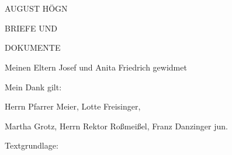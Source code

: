 





























AUGUST HÖGN



BRIEFE UND

DOKUMENTE

Meinen Eltern Josef und Anita Friedrich gewidmet



































































Mein Dank gilt:

Herrn Pfarrer Meier, Lotte Freisinger,

Martha Grotz, Herrn Rektor Roßmeißel, Franz Danzinger jun.



Textgrundlage:

